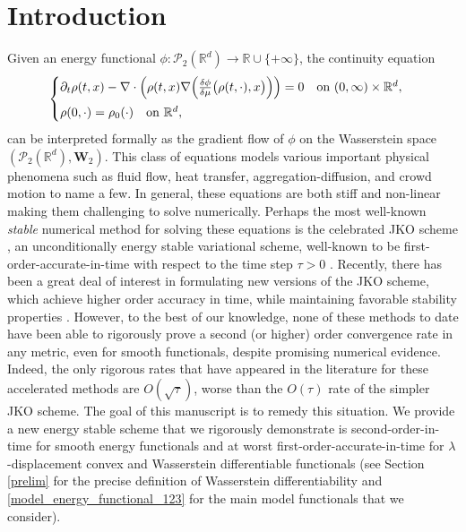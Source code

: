 \documentclass[11pt,a4paper]{amsart}
\newcommand{\1}{\mathds{1}}
\newcommand{\R}{{\mathbb R}}
\newcommand{\PP}{\mathcal{P}}
\numberwithin{equation}{section}
\begin{document}
\tableofcontents

\section{Introduction}

Given an energy functional $\phi:\PP_2(\R^d)\to\R\cup\{+\infty\}$, the continuity equation
\begin{equation}
\label{gradient_flow_eqn12}
\begin{cases}
 \partial_t \rho(t,x) - \nabla\cdot \Bigl(\rho(t,x) \nabla\Bigl(\tfrac{\delta \phi}{\delta \mu}\bigl(\rho(t,\cdot),x\bigr)\Bigr)\Bigr) = 0 \quad \text{on } (0,\infty)\times\mathbb{R}^d,\\[6pt]
 \rho(0,\cdot) = \rho_0(\cdot) \quad \text{on } \mathbb{R}^d,
\end{cases}
\end{equation} can be interpreted formally as the gradient flow of $\phi$ on the Wasserstein space $(\PP_2(\R^d), \mathbf{W}_2)$.
This
class of equations models various important physical phenomena such as fluid flow, heat transfer, aggregation-diffusion, and crowd motion \cite{vazquez2007porous, santambrogio2015optimal} to name a few. In general, these equations are both stiff and non-linear making them challenging to solve numerically.  Perhaps the most well-known \emph{stable} numerical method for solving these equations is the celebrated JKO scheme \cite{jordan1998variational}, an unconditionally energy stable variational scheme,  well-known to be first-order-accurate-in-time with respect to the time step $\tau>0$ \cite{ambrosio2005gradient}.   Recently, there has been a great deal of interest in formulating new versions of the JKO scheme, which achieve higher order accuracy in time, while maintaining favorable stability properties \cite{legendre2017second, matthes2019variational, ashworth2020structure,  zaitzeff_hos, carrillo2022primal, han_hos, gallouet2024geodesic, cances2024discretizing}.  However, to the best of our knowledge, none of these methods to date have been able to rigorously prove a second (or higher) order convergence rate in any metric, even for smooth functionals, despite promising numerical evidence.  Indeed, the only rigorous rates that have appeared in the literature for these accelerated methods are $O(\sqrt{\tau})$, worse than the $O(\tau)$ rate of the simpler JKO scheme.  The goal of this manuscript is to remedy this situation.  We provide a new energy stable scheme that we rigorously demonstrate is second-order-in-time for smooth energy functionals and at worst first-order-accurate-in-time for $\lambda$-displacement convex and Wasserstein differentiable functionals (see Section \ref{prelim} for the precise definition of Wasserstein differentiability and \eqref{model_energy_functional_123} for the main model functionals that we consider).  
\end{document}

